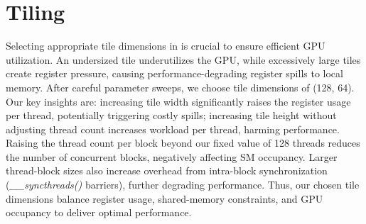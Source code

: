 \section{Tiling}\label{sec:tiling}
Selecting appropriate tile dimensions in \sysname is crucial to ensure efficient GPU utilization.
An undersized tile underutilizes the GPU,
while excessively large tiles create register pressure,
causing performance-degrading register spills to local memory.
After careful parameter sweeps,
we choose tile dimensions of (128, 64).
Our key insights are: increasing tile width significantly raises the register usage per thread,
potentially triggering costly spills;
increasing tile height without adjusting thread count increases workload per thread, harming performance.
Raising the thread count per block beyond our fixed value of 128 threads reduces the number of concurrent blocks,
negatively affecting SM occupancy.
Larger thread-block sizes also increase overhead from intra-block synchronization (\emph{\_\_syncthreads()} barriers),
further degrading performance.
Thus, our chosen tile dimensions balance register usage, shared-memory constraints,
and GPU occupancy to deliver optimal performance.
